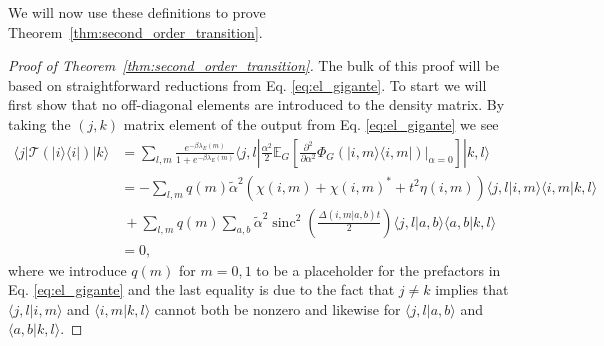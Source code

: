 \documentclass[
 amsmath,amssymb,
 aps,
onecolumn, 
nofootinbib]{revtex4-2}
\newcommand{\ket}[1]{|#1\rangle}
\newcommand{\bra}[1]{\langle #1|}
\newcommand{\braket}[2]{\langle #1|#2\rangle}
\newcommand{\ketbra}[2]{| #1\rangle\! \langle #2|}
\DeclareMathOperator{\sinc}{sinc}
\begin{document}
We will now use these definitions to prove Theorem~\ref{thm:second_order_transition}.
\begin{proof}[Proof of Theorem~\ref{thm:second_order_transition}]
    The bulk of this proof will be based on straightforward reductions from Eq. \eqref{eq:el_gigante}. To start we will first show that no off-diagonal elements are introduced to the density matrix. By taking the $(j,k)$ matrix element of the output from Eq. \eqref{eq:el_gigante} we see
    \begin{align}
        \bra{j} \mathcal{T}(\ketbra{i}{i})\ket{k} &= \sum_{l, m} \frac{e^{-\beta \lambda_E(m)}}{1 + e^{-\beta \lambda_E(m)}} \bra{j, l} \frac{\alpha^2}{2} \mathbb{E}_{G} \left[ \frac{\partial^2}{\partial \alpha^2} \Phi_G(\ketbra{i, m}{i, m}) \big|_{\alpha = 0} \right] \ket{k, l} \\
        &= - \sum_{l,m} q(m) \widetilde{\alpha}^2 (\chi(i,m) + \chi(i,m)^* + t^2 \eta(i,m)) \braket{j, l}{i, m} \braket{i, m}{k, l} \nonumber \\
        &~ + \sum_{l, m} q(m) \sum_{a,b} \widetilde{\alpha}^2 \sinc^2 \left(\frac{\Delta(i,m|a,b)t }{2} \right) \braket{j, l}{a,b} \braket{a, b}{k, l} \\
        &= 0,
    \end{align}
    where we introduce $q(m)$ for $m=0,1$ to be a placeholder for the prefactors in Eq. \eqref{eq:el_gigante} and the last equality is due to the fact that $j \neq k$ implies that $\braket{j, l}{i,m}$ and $\braket{i,m}{k, l}$ cannot both be nonzero and likewise for $\braket{j, l}{a,b}$ and $\braket{a,b}{k,l}$.
    

\end{proof}
\end{document}
